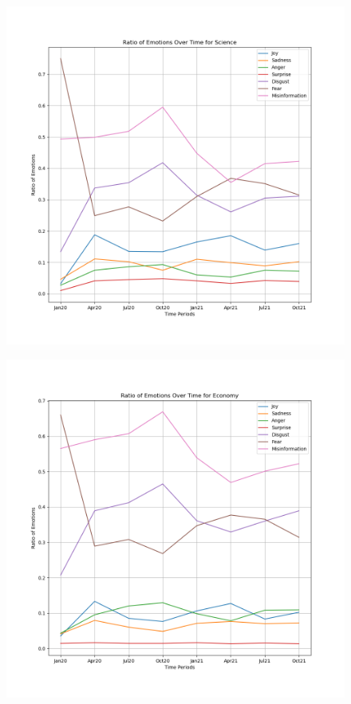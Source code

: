 \documentclass{l4proj}
\begin{document}
\begin{appendices}
\begin{figure}[H]
\begin{minipage}[c]{0.49\linewidth}
\centering
\includegraphics[width=\textwidth]{images/ScienceEmotion.png}
\label{fig:sciemo}
\end{minipage}
\begin{minipage}[c]{0.49\linewidth}
\centering
\includegraphics[width=\textwidth]{images/EconomyEmotion.png}
\label{fig:ecoemo}
\end{minipage}
\end{figure}


\end{appendices}
\end{document}
